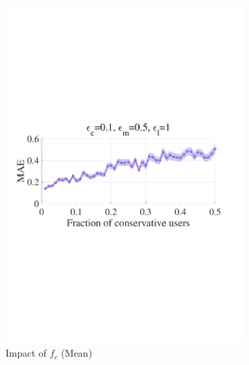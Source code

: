 \documentclass[letterpaper]{article} %
\begin{document}
\begin{figure}[htbp]
  \centering
  \begin{subfigure}[b]{0.23\textwidth}
    \centering
    \includegraphics[width=\textwidth]{picture/MAEvsfc.pdf}
    \caption{{Impact of $f_c$ (Mean)}}
    \label{fig:maevsfc}
  \end{subfigure}
  \hfill
  \begin{subfigure}[b]{0.23\textwidth}
    \centering

\end{subfigure}
\end{figure}
\end{document}
